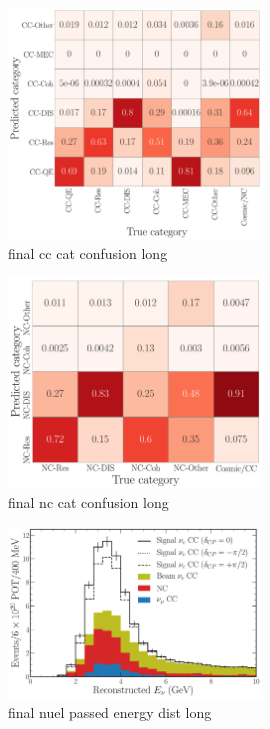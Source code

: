 \begin{figure} %
    \includegraphics[width=0.6\textwidth]{diagrams/6-cvn/chipsnet/final_cc_cat_confusion.pdf}
    \caption[final cc cat confusion short]
    {final cc cat confusion long}
    \label{fig:final_cc_cat_confusion}
\end{figure}

\begin{figure} %
    \includegraphics[width=0.6\textwidth]{diagrams/6-cvn/chipsnet/final_nc_cat_confusion.pdf}
    \caption[final nc cat confusion short]
    {final nc cat confusion long}
    \label{fig:final_nc_cat_confusion}
\end{figure}

\begin{figure} %
    \includegraphics[width=0.6\textwidth]{diagrams/6-cvn/chipsnet/final_nuel_passed_energy_dist.pdf}
    \caption[final nuel passed energy dist short]
    {final nuel passed energy dist long}
    \label{fig:final_nuel_passed_energy_dist}
\end{figure}

